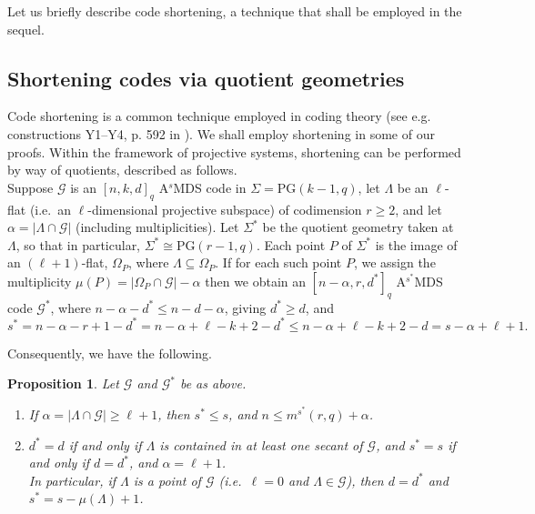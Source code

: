 \documentclass[11pt,a4paper]{amsart}
\newcommand{\AS}{ A$^s$MDS }
\newcommand{\G}{\mathcal{G}}
\theoremstyle{plain}
\newtheorem{proposition}[theorem]{Proposition}
\theoremstyle{definition}
\theoremstyle{remark}
\begin{document}
	Let us briefly describe code shortening, a technique that shall be employed in the sequel.

	\subsection*{Shortening codes via quotient geometries}

	Code shortening is a common technique employed in coding theory (see e.g. constructions Y1--Y4, p. 592 in \cite{MR0465509}). We shall employ shortening in some of our proofs. Within the framework of projective systems, shortening can be performed by way of quotients, described as follows.\\
	Suppose $\G$ is an $[n,k,d]_q$ \AS code in $\Sigma=\text{PG}(k-1,q)$, let $\Lambda$ be an $\ell$-flat (i.e.\ an $\ell$-dimensional projective subspace) of codimension $r\ge 2$, and let $\alpha=|\Lambda \cap \G|$ (including multiplicities).  Let $\Sigma^*$ be the quotient geometry taken at $\Lambda$, so that in particular, $\Sigma^*\cong \text{PG}(r-1,q)$.  Each point $P$ of $\Sigma^*$ is the image of an $(\ell+1)$-flat, $\Omega_P$, where $\Lambda \subseteq \Omega_P$. If for each such point $P$, we assign the multiplicity $\mu(P) = |\Omega_P\cap \G|-\alpha$ then we obtain an $[n-\alpha, r, d^*]_q$ A$^{s^*}$MDS code $\G^*$, where $n-\alpha-d^*\le n-d-\alpha$, giving $d^*\ge d$, and
	\begin{equation}
		s^*=n-\alpha -r+1-d^* = n-\alpha +\ell-k+2-d^* \le n-\alpha +\ell-k+2-d =s-\alpha +\ell+1.
	\end{equation}

	Consequently, we have the following.

	\begin{proposition} \label{prop: quotient properties}
		Let $\G$ and $\G^*$ be as above.

		\begin{enumerate}
			\item If $\alpha = |\Lambda \cap \G|\ge \ell+1$, then $s^*\le s$, and $n \le m^{s^*}(r,q)+\alpha$.
			\item  $d^*=d$ if and only if $\Lambda$ is contained in at least one secant of $\G$, and $s^*=s$ if and only if $d=d^*$, and $\alpha = \ell+1$. \\ In particular, if $\Lambda$ is a point of $\G$ (i.e.\ $\ell=0$ and $\Lambda \in \mathcal{G}$), then $d=d^*$ and $s^*=s-\mu(\Lambda)+1$.
		\end{enumerate}
	\end{proposition}
\end{document}
